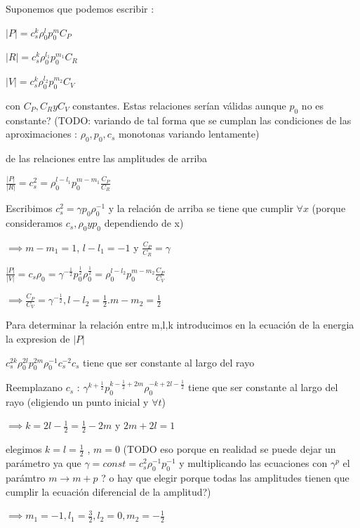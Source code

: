 \documentclass{article}
\begin{document}
\begin{description}  
\item Suponemos que podemos escribir :
\item $|P| = c_s^{k} \rho_0^{l} p_0^{m} C_{P}$
\item $|R| = c_s^{k} \rho_0^{l_1} p_0^{m_1} C_{R}$
\item $|V| = c_s^{k} \rho_0^{l_2} p_0^{m_2} C_{V}$
\item con $C_{P}, C_{R} y C_{V}$ constantes. Estas relaciones serían válidas aunque $p_0$ no es constante? (TODO: variando de tal forma que se cumplan las condiciones de las aproximaciones : $\rho_0, p_0, c_s$ monotonas variando lentamente)
\item de las relaciones entre las amplitudes de arriba 
\item $\frac{|P|}{|R|} = c_s^2 = \rho_0^{l-l_1} p_0^{m-m_1} \frac{C_{P}}{C_{R}}$
\item Escribimos $c_s^2 = \gamma p_0 \rho_0^{-1}$ y la relación de arriba se tiene que cumplir $\forall x$ (porque consideramos $c_s, \rho_0 y p_0 $ dependiendo de x)
\item $\implies m - m_1 = 1$, $l-l_1 = -1$ y $\frac{C_P}{C_R} = \gamma$
\item $\frac{|P|}{|V|} = c_s \rho_0 = \gamma^{-\frac{1}{2}} p_0^{\frac{1}{2}} \rho_0^{\frac{1}{2}} = \rho_0^{l-l_2} p_0^{m-m_2} \frac{C_P}{C_V}$
\item $\implies  \frac{C_P}{C_V} =  \gamma^{-\frac{1}{2}}, l-l_2=\frac{1}{2}. m-m_2 = \frac{1}{2} $
\item Para determinar la relación entre m,l,k introducimos en la ecuación de la energia la expresion de $|P|$
\item $ c_s^{2k} \rho_0^{2l} p_0^{2m} \rho_0^{-1} c_s^{-2} c_s  $ tiene que ser constante al largo del rayo
\item Reemplazano $c_s$ : $ \gamma^{k + \frac{1}{2}} p_0^{k-\frac{1}{2}+2m} \rho_0^{-k + 2l -\frac{1}{2}} $ tiene que ser constante al largo del rayo (eligiendo un punto inicial y $\forall t$)
\item $\implies k = 2l - \frac{1}{2} = \frac{1}{2} - 2m$ y $2m + 2l = 1$
\item elegimos $k = l = \frac{1}{2}$ , $m = 0$ (TODO eso porque en realidad se puede dejar un parámetro ya que $\gamma = const = c_s^{2} \rho_0^{-1} p_0^{-1} $ y multiplicando las ecuaciones con $\gamma^{p}$ el parámtro $m\rightarrow m+p$ ? o hay que elegir porque todas las amplitudes tienen que cumplir la ecuación diferencial de la amplitud?)
\item $\implies m_1=-1, l_1 = \frac{3}{2}, l_2 = 0, m_2 = -\frac{1}{2}$
 

\end{description}
\end{document}

